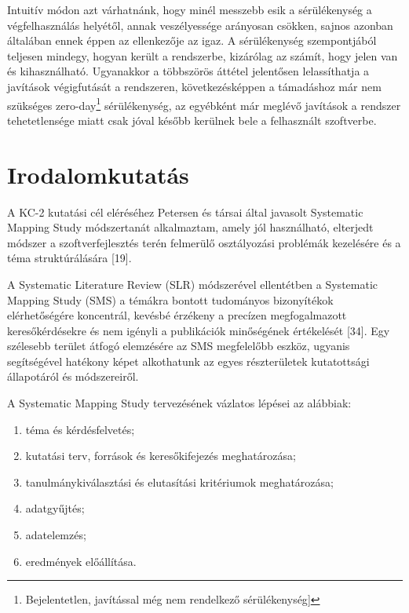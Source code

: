 \documentclass[12pt,magyar,a4paper,oneside]{scrreprt}
\providecommand{\tightlist}{%
  \setlength{\itemsep}{0pt}\setlength{\parskip}{0pt}}
\begin{document}
Intuitív módon azt várhatnánk, hogy minél messzebb esik a sérülékenység
a végfelhasználás helyétől, annak veszélyessége arányosan csökken,
sajnos azonban általában ennek éppen az ellenkezője az igaz. A
sérülékenység szempontjából teljesen mindegy, hogyan került a
rendszerbe, kizárólag az számít, hogy jelen van és kihasználható.
Ugyanakkor a többszörös áttétel jelentősen lelassíthatja a javítások
végigfutását a rendszeren, következésképpen a támadáshoz már nem
szükséges zero-day\footnote{Bejelentetlen, javítással még nem rendelkező
  sérülékenység{]}} sérülékenység, az egyébként már meglévő javítások a
rendszer tehetetlensége miatt csak jóval később kerülnek bele a
felhasznált szoftverbe.

\hypertarget{irodalomkutatuxe1s}{%
\section{Irodalomkutatás}\label{irodalomkutatuxe1s}}

A KC-2 kutatási cél eléréséhez Petersen és társai által javasolt
Systematic Mapping Study módszertanát alkalmaztam, amely jól
használható, elterjedt módszer a szoftverfejlesztés terén felmerülő
osztályozási problémák kezelésére és a téma struktúrálására {[}19{]}.

A Systematic Literature Review (SLR) módszerével ellentétben a
Systematic Mapping Study (SMS) a témákra bontott tudományos bizonyítékok
elérhetőségére koncentrál, kevésbé érzékeny a precízen megfogalmazott
keresőkérdésekre és nem igényli a publikációk minőségének értékelését
{[}34{]}. Egy szélesebb terület átfogó elemzésére az SMS megfelelőbb
eszköz, ugyanis segítségével hatékony képet alkothatunk az egyes
részterületek kutatottsági állapotáról és módszereiről.

A Systematic Mapping Study tervezésének vázlatos lépései az alábbiak:

\begin{enumerate}
\def\labelenumi{\arabic{enumi}.}
\tightlist
\item
  téma és kérdésfelvetés;
\item
  kutatási terv, források és keresőkifejezés meghatározása;
\item
  tanulmánykiválasztási és elutasítási kritériumok meghatározása;
\item
  adatgyűjtés;
\item
  adatelemzés;
\item
  eredmények előállítása.
\end{enumerate}
\end{document}
